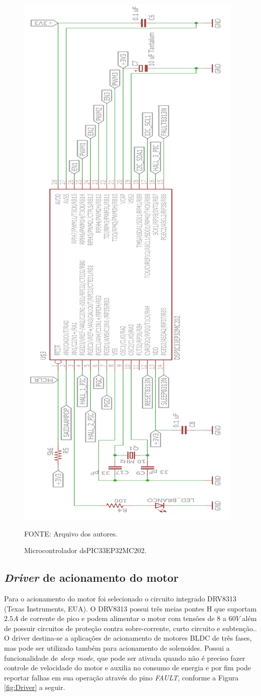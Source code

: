 \documentclass[
	12pt,				%
	openany,			%
	twoside,			%
	a4paper,			%
	english,			%
	french,				%
	spanish,			%
	brazil,				%
	oldfontcommands
	]{abntex2}
\begin{document}
\begin{figure}[th]
	\caption{Microcontrolador dsPIC33EP32MC202.}
	\centering
	\includegraphics[height=1.2\linewidth]{./figs/dsPIC_motores}
	
	\begin{small}
		FONTE: Arquivo dos autores.
	\end{small}
	\label{fig:dsPIC202}
\end{figure} 

\newpage

\subsection{\textit{Driver} de acionamento do motor}

Para o acionamento do motor foi selecionado o circuito integrado DRV8313 (Texas Instruments, EUA). O DRV8313 possui três meias pontes H que suportam $2.5A$ de corrente de pico e podem alimentar o motor com tensões de $8$ a $60V$ além de possuir circuitos de proteção contra sobre-corrente, curto circuito e subtenção.\cite{DRV8313}. O driver destina-se a aplicações de acionamento de motores BLDC de três fases, mas pode ser utilizado também para acionamento de solenoides. Possui a funcionalidade de \textit{sleep mode}, que pode ser ativada quando não é preciso fazer controle de velocidade do motor e auxilia no consumo de energia e por fim pode reportar falhas em sua operação através do pino \textit{FAULT}, conforme a Figura \ref{fig:Driver} a seguir.
\end{document}

